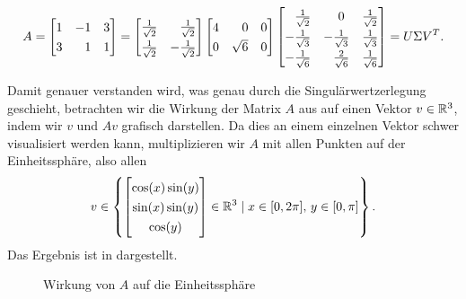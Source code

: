 \begin{example}
\begin{equation*}
        A =
        \begin{bmatrix}
            1 & -1 & 3 \\
            3 & \phantom{-}1 & 1
        \end{bmatrix}
        =
        \begingroup
        \renewcommand{\arraystretch}{1.3}
        \begin{bmatrix}
            \frac{1}{\sqrt{2}} & \phantom{-}\frac{1}{\sqrt{2}} \\
            \frac{1}{\sqrt{2}} & -\frac{1}{\sqrt{2}}
        \end{bmatrix}
        \endgroup
        \begin{bmatrix}
            4 & \phantom{\surd}0 & 0 \\
            0 & \sqrt{6} & 0
        \end{bmatrix}
        \begingroup
        \renewcommand{\arraystretch}{1.3}
        \begin{bmatrix}
            \phantom{-}\frac{1}{\sqrt{2}} & \phantom{-}0 & \frac{1}{\sqrt{2}} \\
            -\frac{1}{\sqrt{3}} & -\frac{1}{\sqrt{3}} & \frac{1}{\sqrt{3}} \\
            -\frac{1}{\sqrt{6}} & \phantom{-}\frac{2}{\sqrt{6}} & \frac{1}{\sqrt{6}} \\
        \end{bmatrix}
        \endgroup
        =
        U \Sigma V^{T}.
    \end{equation*}
\end{example}
Damit genauer verstanden wird, was genau durch die Singulärwertzerlegung geschieht, betrachten wir die Wirkung der Matrix \(A\) aus  auf einen Vektor \(v \in \mathbb{R}^{3}\), indem wir \(v\) und \(Av\) grafisch darstellen.  
Da dies an einem einzelnen Vektor schwer visualisiert werden kann, multiplizieren wir \(A\) mit allen Punkten auf der Einheitssphäre, also allen 
\begin{equation*}
    v \in 
    \left\{
    \begin{bmatrix}
        \cos(x)\sin(y) \\ \sin(x)\sin(y) \\ \cos(y)
    \end{bmatrix}
    \in \R^{3}
    \mid
    x \in [0, 2\pi], \, y \in [0, \pi]
    \right\}.
\end{equation*} 
Das Ergebnis ist in  dargestellt. 
\begin{figure}[b]
    \centering
    \begin{subfigure}{0.45\textwidth}
        \centering
        
    \end{subfigure}
    \begin{subfigure}{0.45\textwidth}
        \centering
        
    \end{subfigure}
    \caption{Wirkung von \(A\) auf die Einheitssphäre}\label{fig:sph}
\end{figure}
